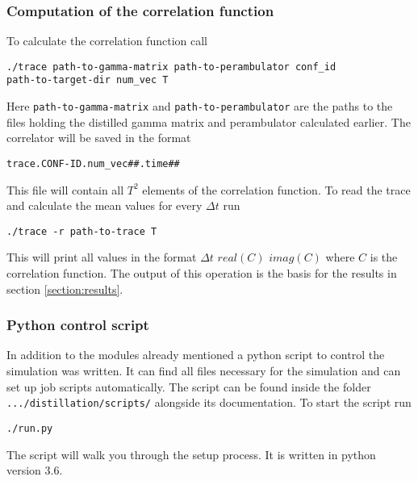     \subsubsection{Computation of the correlation function}
        To calculate the correlation function call
        \begin{verbatim}
./trace path-to-gamma-matrix path-to-perambulator conf_id 
path-to-target-dir num_vec T\end{verbatim}
        Here \verb+path-to-gamma-matrix+ and \verb+path-to-perambulator+ are the paths to the files holding the distilled gamma matrix and perambulator calculated earlier. The correlator will be saved in the format
        \begin{verbatim}
trace.CONF-ID.num_vec##.time##\end{verbatim}
        This file will contain all $T^2$ elements of the correlation function. To read the trace and calculate the mean values for every $\Delta t$ run
        \begin{verbatim}
./trace -r path-to-trace T\end{verbatim}
        This will print all values in the format $\Delta t$ $real(C)$ $imag(C)$ where $C$ is the correlation function. The output of this operation is the basis for the results in section \ref{section:results}.
        
    \subsubsection{Python control script}
        In addition to the modules already mentioned a python script to control the simulation was written. It can find all files necessary for the simulation and can set up job scripts automatically. The script can be found inside the folder \verb+.../distillation/scripts/+ alongside its documentation. To start the script run
        \begin{verbatim}
./run.py\end{verbatim}
        The script will walk you through the setup process. It is written in python version 3.6.
    